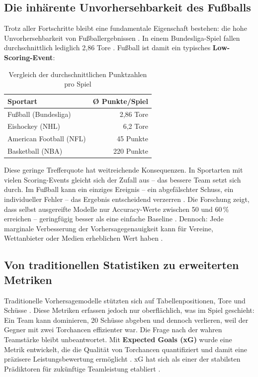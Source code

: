 \subsection{Die inhärente Unvorhersehbarkeit des Fußballs}

Trotz aller Fortschritte bleibt eine fundamentale Eigenschaft bestehen:
die hohe Unvorhersehbarkeit von Fußballergebnissen \cite{DobsonGoddard2011}.
In einem Bundesliga-Spiel fallen durchschnittlich lediglich 2,86 Tore
\cite{Transfermarkt2024}. Fußball ist damit ein typisches
\textbf{Low-Scoring-Event}:

\begin{table}[h]
    \centering
    \caption{Vergleich der durchschnittlichen Punktzahlen pro Spiel}
    \label{tab:scoring-comparison}
    \begin{tabular}{l r}
        \toprule
        \textbf{Sportart} & \textbf{Ø Punkte/Spiel} \\
        \midrule
        Fußball (Bundesliga) & 2,86 Tore \\
        Eishockey (NHL)      & 6,2 Tore \\
        American Football (NFL) & 45 Punkte \\
        Basketball (NBA)     & 220 Punkte \\
        \bottomrule
    \end{tabular}
\end{table}

Diese geringe Trefferquote hat weitreichende Konsequenzen. In Sportarten
mit vielen Scoring-Events gleicht sich der Zufall aus -- das bessere Team
setzt sich durch. Im Fußball kann ein einziges Ereignis -- ein abgefälschter
Schuss, ein individueller Fehler -- das Ergebnis entscheidend verzerren
\cite{Sumpter2016}. Die Forschung zeigt, dass selbst ausgereifte Modelle
nur Accuracy-Werte zwischen 50 und 60\,\% erreichen -- geringfügig besser
als eine einfache Baseline \cite{BunkerThabtah2019,HubacekSourekZelezny2019}.
Dennoch: Jede marginale Verbesserung der Vorhersagegenauigkeit kann für
Vereine, Wettanbieter oder Medien erheblichen Wert haben
\cite{ForrestSimmons2000}.

\subsection{Von traditionellen Statistiken zu erweiterten Metriken}

Traditionelle Vorhersagemodelle stützten sich auf Tabellenpositionen, Tore
und Schüsse \cite{DobsonGoddard2011}. Diese Metriken erfassen jedoch nur
oberflächlich, was im Spiel geschieht: Ein Team kann dominieren, 20 Schüsse
abgeben und dennoch verlieren, weil der Gegner mit zwei Torchancen
effizienter war. Die Frage nach der \glqq wahren\grqq{} Teamstärke bleibt
unbeantwortet. Mit \textbf{Expected Goals (xG)} wurde eine Metrik
entwickelt, die die Qualität von Torchancen quantifiziert und damit eine
präzisere Leistungsbewertung ermöglicht \cite{AnzerBauer2021}. xG hat sich
als einer der stabilsten Prädiktoren für zukünftige Teamleistung
etabliert \cite{WheatcroftVanEetvelde2020}.

